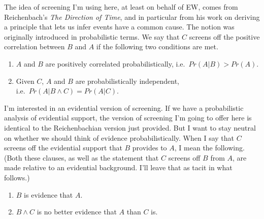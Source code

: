 \documentclass[
  11pt,
  letterpaper,
  DIV=11,
  numbers=noendperiod,
  oneside]{scrartcl}
\providecommand{\tightlist}{%
  \setlength{\itemsep}{0pt}\setlength{\parskip}{0pt}}\usepackage{longtable,booktabs,array}
\begin{document}
The idea of screening I'm using here, at least on behalf of EW, comes
from Reichenbach's \emph{The Direction of Time}, and in particular from
his work on deriving a principle that lets us infer events have a common
cause. The notion was originally introduced in probabilistic terms. We
say that \(C\) screens off the positive correlation between \(B\) and
\(A\) if the following two conditions are met.

\begin{enumerate}
\def\labelenumi{\arabic{enumi}.}
\tightlist
\item
  \(A\) and \(B\) are positively correlated probabilistically,
  i.e.~\(Pr(A | B) > Pr(A)\).
\item
  Given \(C\), \(A\) and \(B\) are probabilistically independent,\\
  i.e.~\(Pr(A | B \wedge C) = Pr(A | C)\).
\end{enumerate}

I'm interested in an evidential version of screening. If we have a
probabilistic analysis of evidential support, the version of screening
I'm going to offer here is identical to the Reichenbachian version just
provided. But I want to stay neutral on whether we should think of
evidence probabilistically. When I say
that \(C\) screens off the evidential support that \(B\) provides to
\(A\), I mean the following. (Both these clauses, as well as the
statement that \(C\) screens off \(B\) from \(A\), are made relative to
an evidential background. I'll leave that as tacit in what follows.)

\begin{enumerate}
\def\labelenumi{\arabic{enumi}.}
\tightlist
\item
  \(B\) is evidence that \(A\).
\item
  \(B \wedge C\) is no better evidence that \(A\) than \(C\)
  is.
\end{enumerate}
\end{document}
